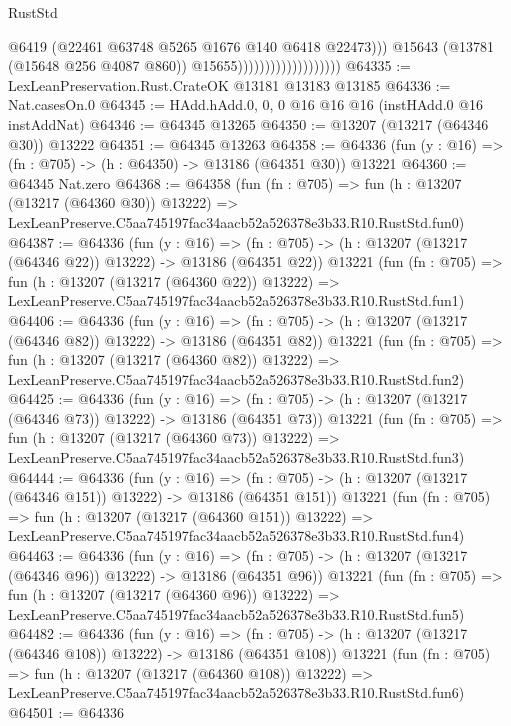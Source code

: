 \begin{lexlean}{RustStd}
\begin{coremodule}
                                              @6419
                                              (@22461 @63748 @5265 @1676 @140 @6418 @22473)))
                                          @15643
                                          (@13781 (@15648 @256 @4087 @860))
                                          @15655)))))))))))))))))))
@64335 := LexLeanPreservation.Rust.CrateOK @13181 @13183 @13185
@64336 := Nat.casesOn.{0}
@64345 := HAdd.hAdd.{0, 0, 0} @16 @16 @16 (instHAdd.{0} @16 instAddNat)
@64346 := @64345 @13265
@64350 := @13207 (@13217 (@64346 @30)) @13222
@64351 := @64345 @13263
@64358 := @64336 (fun (y : @16) => (fn : @705) -> (h : @64350) -> @13186 (@64351 @30)) @13221
@64360 := @64345 Nat.zero
@64368 := @64358
    (fun (fn : @705) =>
    fun (h : @13207 (@13217 (@64360 @30)) @13222) =>
    LexLeanPreserve.C5aa745197fac34aacb52a526378e3b33.R10.RustStd.fun0)
@64387 := @64336
    (fun (y : @16) =>
    (fn : @705) -> (h : @13207 (@13217 (@64346 @22)) @13222) -> @13186 (@64351 @22))
    @13221
    (fun (fn : @705) =>
    fun (h : @13207 (@13217 (@64360 @22)) @13222) =>
    LexLeanPreserve.C5aa745197fac34aacb52a526378e3b33.R10.RustStd.fun1)
@64406 := @64336
    (fun (y : @16) =>
    (fn : @705) -> (h : @13207 (@13217 (@64346 @82)) @13222) -> @13186 (@64351 @82))
    @13221
    (fun (fn : @705) =>
    fun (h : @13207 (@13217 (@64360 @82)) @13222) =>
    LexLeanPreserve.C5aa745197fac34aacb52a526378e3b33.R10.RustStd.fun2)
@64425 := @64336
    (fun (y : @16) =>
    (fn : @705) -> (h : @13207 (@13217 (@64346 @73)) @13222) -> @13186 (@64351 @73))
    @13221
    (fun (fn : @705) =>
    fun (h : @13207 (@13217 (@64360 @73)) @13222) =>
    LexLeanPreserve.C5aa745197fac34aacb52a526378e3b33.R10.RustStd.fun3)
@64444 := @64336
    (fun (y : @16) =>
    (fn : @705) -> (h : @13207 (@13217 (@64346 @151)) @13222) -> @13186 (@64351 @151))
    @13221
    (fun (fn : @705) =>
    fun (h : @13207 (@13217 (@64360 @151)) @13222) =>
    LexLeanPreserve.C5aa745197fac34aacb52a526378e3b33.R10.RustStd.fun4)
@64463 := @64336
    (fun (y : @16) =>
    (fn : @705) -> (h : @13207 (@13217 (@64346 @96)) @13222) -> @13186 (@64351 @96))
    @13221
    (fun (fn : @705) =>
    fun (h : @13207 (@13217 (@64360 @96)) @13222) =>
    LexLeanPreserve.C5aa745197fac34aacb52a526378e3b33.R10.RustStd.fun5)
@64482 := @64336
    (fun (y : @16) =>
    (fn : @705) -> (h : @13207 (@13217 (@64346 @108)) @13222) -> @13186 (@64351 @108))
    @13221
    (fun (fn : @705) =>
    fun (h : @13207 (@13217 (@64360 @108)) @13222) =>
    LexLeanPreserve.C5aa745197fac34aacb52a526378e3b33.R10.RustStd.fun6)
@64501 := @64336

\end{coremodule}
\end{lexlean}

